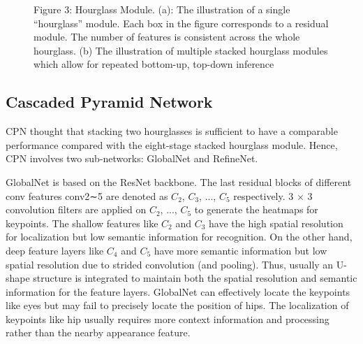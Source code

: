 \captionsetup[figure]{labelformat=empty}
\begin{figure}
  \centering
  \hspace{1in}
  \caption{Figure 3: Hourglass Module. (a): The illustration of a single “hourglass” module. Each box in the figure corresponds
to a residual module. The number of features is consistent across the whole hourglass. (b) The illustration of multiple stacked hourglass modules
which allow for repeated bottom-up, top-down inference}
  \label{fig:1} %
\end{figure}

\subsection{Cascaded Pyramid Network}
CPN\cite{chen2017cascaded} thought that stacking two hourglasses is sufficient to have a comparable performance
compared with the eight-stage stacked hourglass module. Hence, CPN involves two sub-networks: GlobalNet and RefineNet.

GlobalNet is based on the ResNet backbone. The last residual blocks of different conv features conv2∼5 are denoted as $C_{2}$, $C_{3}$, ..., $C_{5}$ respectively.
3 × 3 convolution filters are applied on $C_{2}$, ..., $C_{5}$ to generate the heatmaps for keypoints.
The shallow features like $C_{2}$ and $C_{3}$ have the high spatial resolution for localization but low semantic information for recognition.
On the other hand, deep feature layers like $C_{4}$ and $C_{5}$ have more semantic information but low spatial resolution due to strided convolution (and pooling).
Thus, usually an U-shape structure is integrated to maintain both the spatial resolution and semantic information for the feature layers.
GlobalNet can effectively locate the keypoints like eyes but may fail to precisely locate the position of hips.
The localization of keypoints like hip usually requires more context information and processing rather than the nearby appearance feature.

